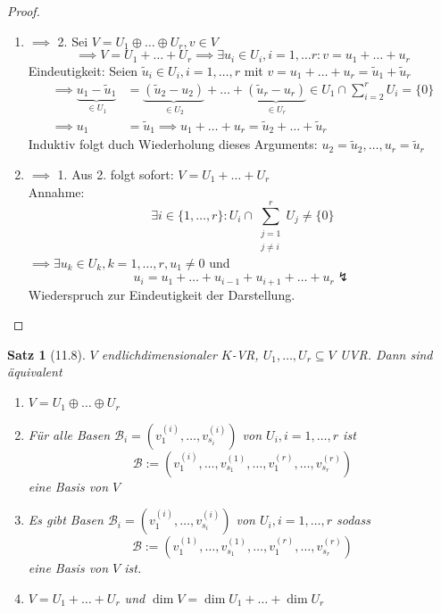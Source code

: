 \documentclass[a4paper]{scrartcl}
\DeclareMathOperator{\Exists}{\exists}
\theoremstyle{definition}
\theoremstyle{plain}
\newtheorem{thm}{Satz}
\theoremstyle{plain}
\theoremstyle{remark}
\theoremstyle{remark}
\theoremstyle{remark}
\theoremstyle{remark}
\theoremstyle{remark}
\begin{document}
\begin{proof}
\begin{enumerate}
\item $\implies$ 2. Sei $V = U_1 \oplus \ldots \oplus U_r, v\in V$
         \[\implies V = U_1 + \ldots + U_r \implies \Exists u_i \in U_i, i=1,\ldots r: v= u_1 + \ldots + u_r\]
         Eindeutigkeit: Seien $\tilde u_i \in U_i, i = 1, \ldots, r$ mit $v = u_1 + \ldots + u_r = \tilde u_1 + \tilde u_r$
\begin{align*}
\implies \underbrace{u_1 - \tilde u_1}_{\in U_1} &= \underbrace{(\tilde u_2 - u_2)}_{\in U_2} + \ldots + \underbrace{(\tilde u_r - u_r)}_{\in U_r} \in U_1 \cap \sum_{i = 2}^{r} U_i = \{0\} \\
\implies u_1 &= \tilde u_1 \implies u_1 + \ldots + u_r = \tilde u_2 + \ldots + \tilde u_r
\end{align*}
Induktiv folgt duch Wiederholung dieses Arguments: $u_2 = \tilde u_2, \ldots, u_r = \tilde u_r$
\item $\implies$ 1. Aus 2. folgt sofort: $V = U_1 + \ldots + U_r$  \\
         Annahme:
\[\Exists i\in \{1,\ldots, r\}: U_i \cap \sum_{\substack{j = 1 \\ j \neq i}}^{r} U_j \neq \{0\}\]
$\implies \Exists u_k \in U_k, k = 1,\ldots, r, u_1 \neq 0$ und
\[u_i = u_1 + \ldots + u_{i - 1} + u_{i + 1} + \ldots + u_r \lightning\]
Wiederspruch zur Eindeutigkeit der Darstellung.
\end{enumerate}
\end{proof}
\begin{thm}[11.8]
$V$ endlichdimensionaler $K$-VR, $U_1, \ldots, U_r \subseteq V$ UVR. Dann sind äquivalent
\begin{enumerate}
\item $V = U_1 \oplus \ldots \oplus U_r$
\item Für alle Basen $\mathcal{B}_i = (v_1^{(i)}, \ldots, v_{s_i}^{(i)})$ von $U_i, i = 1,\ldots, r$ ist
\[\mathcal{B}:= (v_1^{(i)}, \ldots, v_{s_1}^{(1)}, \ldots, v_1^{(r)}, \ldots, v_{s_r}^{(r)})\]
eine Basis von $V$
\item Es gibt Basen $\mathcal{B}_i = (v_1^{(i)}, \ldots, v_{s_i}^{(i)})$ von $U_i, i = 1,\ldots, r$ sodass
\[\mathcal{B}:= (v_1^{(1)}, \ldots, v_{s_1}^{(1)}, \ldots, v_1^{(r)}, \ldots, v_{s_r}^(r))\]
eine Basis von $V$ ist.
\item $V = U_1 + \ldots + U_r$ und $\dim V = \dim U_1 + \ldots + \dim U_r$
\end{enumerate}
\end{thm}
\end{document}
